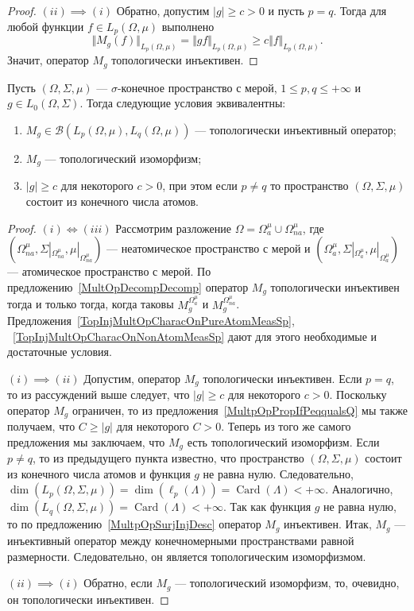 \begin{proof}
$(ii) \implies (i)$ Обратно, допустим $|g|\geq c>0$ и пусть $p=q$. Тогда для
любой функции $f\in L_p(\Omega,\mu)$ выполнено
$$
\Vert M_g(f)\Vert_{L_p(\Omega,\mu)}
=\Vert g f\Vert_{L_p(\Omega,\mu)}
\geq c\Vert f\Vert_{L_p(\Omega,\mu)}.
$$
Значит, оператор $M_g$ топологически инъективен.
\end{proof}

\begin{proposition}\label{TopInjMultOpCharacOnMeasSp} Пусть
$(\Omega,\Sigma,\mu)$ --- $\sigma$-конечное пространство с мерой, 
$1\leq p,q\leq +\infty$ и $g\in L_0(\Omega,\Sigma)$. 
Тогда следующие условия эквивалентны:

\begin{enumerate}[label = (\roman*)]
    \item $M_g\in\mathcal{B}(L_p(\Omega,\mu),L_q(\Omega,\mu))$ --- топологически
    инъективный оператор;

    \item $M_g$ --- топологический изоморфизм;

    \item $|g|\geq c$ для некоторого $c>0$, при этом если $p\neq q$ 
    то пространство $(\Omega,\Sigma,\mu)$ состоит из конечного числа атомов.
\end{enumerate}
\end{proposition}
\begin{proof} $(i) \Longleftrightarrow (iii)$ Рассмотрим разложение
$\Omega=\Omega_a^{\mu}\cup\Omega_{na}^{\mu}$, где
$(\Omega_{na}^{\mu},\Sigma|_{\Omega_{na}^{\mu}},\mu|_{\Omega_{na}^{\mu}})$ ---
неатомическое пространство с мерой и
$(\Omega_a^{\mu},\Sigma|_{\Omega_a^{\mu}},\mu|_{\Omega_a^{\mu}})$ ---
атомическое пространство с мерой. По предложению~\ref{MultOpDecompDecomp}
оператор $M_g$ топологически инъективен тогда и только тогда, когда таковы
$M_g^{\Omega_a^{\mu}}$ и $M_g^{\Omega_{na}^{\mu}}$.
Предложения~\ref{TopInjMultOpCharacOnPureAtomMeasSp},
~\ref{TopInjMultOpCharacOnNonAtomMeasSp}
дают для этого необходимые и достаточные условия.

$(i) \implies (ii)$ Допустим, оператор $M_g$ топологически инъективен. Если
$p=q$, то из рассуждений выше следует, что $|g|\geq c$ для некоторого $c>0$.
Поскольку оператор $M_g$ ограничен, то из
предложения~\ref{MultpOpPropIfPeqqualsQ} мы также получаем, что $C\geq |g|$ для
некоторого $C>0$. Теперь из того же самого предложения мы заключаем, что $M_g$
есть топологический изоморфизм. Если $p\neq q$, то из предыдущего пункта
известно, что пространство $(\Omega,\Sigma,\mu)$ состоит из конечного числа
атомов и функция $g$ не равна нулю. Следовательно,
$\operatorname{dim}(L_p(\Omega,\Sigma,\mu))
=\operatorname{dim}(\ell_p(\Lambda))=\operatorname{Card}(\Lambda)<+\infty$.
Аналогично,
$\operatorname{dim}(L_q(\Omega,\Sigma,\mu))
=\operatorname{Card}(\Lambda)<+\infty$.
Так как функция $g$ не равна нулю, то по предложению~\ref{MultpOpSurjInjDesc}
оператор $M_g$ инъективен. Итак, $M_g$ --- инъективный оператор между
конечномерными пространствами равной размерности. Следовательно, он является
топологическим изоморфизмом.

$(ii) \implies (i)$ Обратно, если $M_g$ --- топологический изоморфизм, то,
очевидно, он топологически инъективен.
\end{proof}


